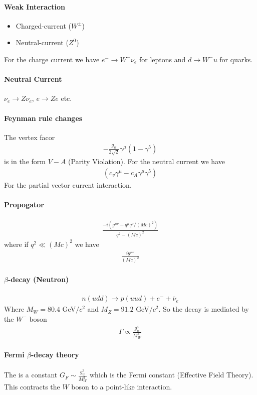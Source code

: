 \documentclass[../main.tex]{subfiles}
\begin{document}
\paragraph*{Weak Interaction}
\begin{itemize}
    \item Charged-current ($W^\pm$) 
    \item Neutral-current ($Z^0$)
\end{itemize}
For the charge current we have $e^- \to W^- \nu_e$ for leptons and $d \to W^- u$ for quarks. 

\paragraph*{Neutral Current}
$\nu_e \to Z \nu_e$, $e \to Z e$ etc. 

\paragraph*{Feynman rule changes}
The vertex facor
\begin{align*}
    -\frac{g_w}{2\sqrt{2}} \gamma^\mu (1 - \gamma^5)
\end{align*} is in the form $V - A$ (Parity Violation). For the neutral current we have
\begin{align*}
    (c_v \gamma^\mu - c_A \gamma^\mu \gamma^5)
\end{align*}
For the partial vector current interaction. 
\paragraph*{Propogator}
\begin{align*}
    \frac{-i(g^{\mu\nu} - q^\mu q^\nu/(Mc)^2)}{q^2 - (Mc)^2}
\end{align*}
where if $q^2 \ll (Mc)^2$ we have
\begin{align*}
    \frac{i g^{\mu\nu}}{(Mc)^2}
\end{align*}

\paragraph*{$\beta$-decay (Neutron)}
\begin{align*}
    n (udd) \to p(uud) + e^- + \bar \nu_e
\end{align*}
Where $M_W = 80.4$ GeV$/c^2$ and $M_Z = 91.2$ GeV$/c^2$. So the decay is mediated by the $W^-$ boson
\begin{align*}
    \Gamma \propto \frac{g_w^4}{M_W^4}
\end{align*}

\paragraph*{Fermi $\beta$-decay theory}
The is a constant $G_F \sim \frac{g_w^2}{M_W^2}$ which is the Fermi constant (Effective Field Theory).
This contracts the $W$ boson to a point-like interaction. 
\end{document}
